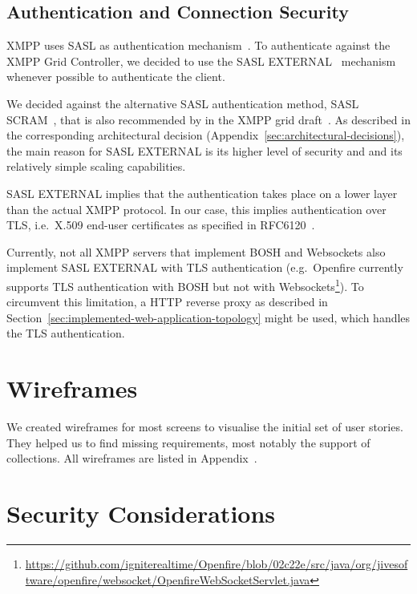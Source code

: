 \subsection{Authentication and Connection Security}\label{sec:authentication-and-connection-security}

XMPP uses SASL as authentication mechanism~\cite{rfc6120}.
To authenticate against the XMPP Grid Controller, we decided to use the SASL EXTERNAL~\cite{rfc4422} mechanism whenever possible to authenticate the client.

We decided against the alternative SASL authentication method, SASL SCRAM~\cite{rfc7677}, that is also recommended by in the XMPP grid draft~\cite{ietf-mile-xmpp-grid-05}.
As described in the corresponding architectural decision (Appendix~\ref{sec:architectural-decisions}), the main reason for SASL EXTERNAL is its higher level of security and and its relatively simple scaling capabilities.

SASL EXTERNAL implies that the authentication takes place on a lower layer than the actual XMPP protocol. In our case, this implies authentication over TLS, i.e.~X.509 end-user certificates as specified in RFC6120~\cite{rfc6120}.

Currently, not all XMPP servers that implement BOSH and Websockets also implement SASL EXTERNAL with TLS authentication
(e.g.\ Openfire currently supports TLS authentication with BOSH but not with Websockets\footnote{\url{https://github.com/igniterealtime/Openfire/blob/02c22e/src/java/org/jivesoftware/openfire/websocket/OpenfireWebSocketServlet.java}}).
To circumvent this limitation, a HTTP reverse proxy as described in Section~\ref{sec:implemented-web-application-topology} might be used, which handles the TLS authentication.


\section{Wireframes}

We created wireframes for most screens to visualise the initial set of user stories.
They helped us to find missing requirements, most notably the support of collections.
All wireframes are listed in Appendix~.

\section{Security Considerations}\label{sec:security-considerations}

